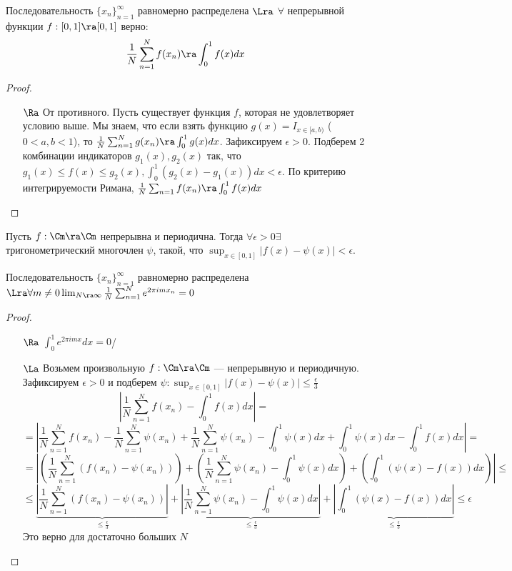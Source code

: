 \begin{theorem}
    Последовательность \(\{x_n\}_{n = 1}^\infty\) равномерно распределена \(\Lra\) \(\forall\) непрерывной функции \(f: [0, 1] \ra [0, 1]\) верно:
    \[\frac{1}{N}\sum_{n = 1}^N f(x_n) \ra \int_0^1 f(x)dx\]
\end{theorem}
\begin{proof}\indent
    \begin{enumerate}
        \item[\(\Ra\)] От противного. Пусть существует функция \(f\), которая не удовлетворяет условию выше. Мы знаем, что если взять функцию \(g(x) = I_{x \in [a, b)}\) (\(0 < a, b < 1\)), то \(\frac{1}{N}\sum_{n = 1}^N g(x_n) \ra \int_0^1 g(x)dx\). Зафиксируем \(\epsilon > 0\). Подберем 2 комбинации индикаторов \(g_1(x), g_2(x)\) так, что \(g_1(x) \le f(x) \le g_2(x), \int_0^1 (g_2(x) - g_1(x))dx < \epsilon\). По критерию интегрируемости Римана, \(\frac{1}{N}\sum_{n = 1}f(x_n) \ra \int_0^1 f(x)dx\)
    \end{enumerate}
\end{proof}

\begin{theorem}
    Пусть \(f: \Cm \ra \Cm\) непрерывна и периодична. Тогда \(\forall \epsilon > 0 \exists\) тригонометрический многочлен \(\psi\), такой, что \(\sup_{x \in [0, 1]} |f(x) - \psi(x)| < \epsilon\).
\end{theorem}

\begin{theorem}
    Последовательность \(\{x_n\}_{n = 1}^\infty\) равномерно распределена \(\Lra \forall m \ne 0 \lim_{N \ra \infty}\frac{1}{N}\sum_{n = 1}^N e^{2\pi i m x_n} = 0\) 
\end{theorem}
\begin{proof}
    \begin{enumerate}
        \item[\(\Ra\)] \(\int_0^1 e^{2\pi i m x}dx = 0\)/
        \item[\(\La\)] Возьмем произвольную \(f: \Cm \ra \Cm\) --- непрерывную и периодичную. Зафиксируем \(\epsilon > 0\) и подберем \(\psi: \sup_{x \in [0, 1]} |f(x) - \psi(x)| \le \frac{\epsilon}{3}\)
        \[\left|\frac{1}{N}\sum_{n = 1}^N f(x_n) - \int_0^1 f(x)dx\right| =\]
        \[ = \left|\frac{1}{N}\sum_{n = 1}^N f(x_n) - \frac{1}{N}\sum_{n = 1}^N \psi(x_n) + \frac{1}{N}\sum_{n = 1}^N \psi(x_n) - \int_0^1 \psi(x)dx + \int_0^1 \psi(x)dx -\int_0^1 f(x)dx\right|= \]
        \[= \left|\left(\frac{1}{N}\sum_{n = 1}^N (f(x_n) - \psi(x_n))\right) + \left(\frac{1}{N}\sum_{n = 1}^N \psi(x_n) - \int_0^1 \psi(x)dx\right) + \left(\int_0^1 (\psi(x) - f(x))dx\right)\right| \le\]
        \[\le \underbrace{\left|\frac{1}{N}\sum_{n = 1}^N (f(x_n) - \psi(x_n))\right|}_{\le \frac{\epsilon}{3}} + \underbrace{\left|\frac{1}{N}\sum_{n = 1}^N \psi(x_n) - \int_0^1 \psi(x)dx\right|}_{\le \frac{\epsilon}{3}} + \underbrace{\left|\int_0^1 (\psi(x) - f(x))dx\right|}_{\le \frac{\epsilon}{3}} \le \epsilon\]
        Это верно для достаточно больших \(N\)
    \end{enumerate}
\end{proof}

